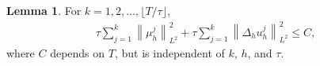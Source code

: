 \documentclass[11pt, reqno]{amsart}
\theoremstyle{definition}
\newtheorem{lemma}[theorem]{Lemma}
\numberwithin{equation}{section}
\newcommand{\dx}{\mathrm{d}x}
\newcommand{\norm}[2]{\left\|{#1}\right\|_{#2}}
\newcommand{\abs}[1]{\left|{#1}\right|}
\begin{document}
%


\begin{lemma}
For $k=1,2,\ldots, \lfloor T/\tau \rfloor$,
\begin{align}\label{equ:stab sum mu L2}
	\tau \sum_{j=1}^k \norm{\mu_h^j}{L^2}^2 + \tau \sum_{j=1}^k \norm{\Delta_h u_h^j}{L^2}^2 \leq C,
\end{align}
where $C$ depends on $T$, but is independent of $k$, $h$, and $\tau$.
\end{lemma}
\end{document}

